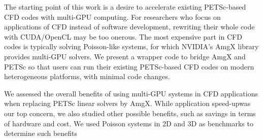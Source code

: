 The starting point of this work is a desire to accelerate existing 
PETSc\cite{petsc-web-page}-based CFD codes with multi-GPU computing.
For researchers who focus on applications of CFD instead of software development,
rewriting their whole code with CUDA/OpenCL may be too onerous.
The most expensive part in CFD codes is typically solving Poisson-like systems,
for which NVIDIA's AmgX\cite{amgx-web-page} library provides multi-GPU solvers.
We present a wrapper code to bridge AmgX and PETSc so that users can 
run their existing PETSc-based CFD codes on modern heterogeneous platforms, 
with minimal code changes.

We assessed the overall benefits of using multi-GPU systems in CFD applications
when replacing PETSc linear solvers by AmgX.
While application speed-up\footnotemark was our top concern, we also studied 
other possible benefits, such as savings in terms of hardware and cost.
We used Poisson systems in 2D and 3D as benchmarks to determine such benefits

